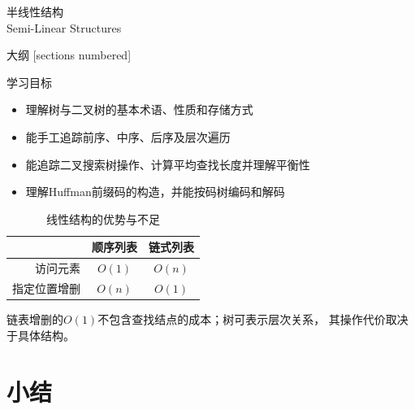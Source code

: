 \begin{standout}[第二章]
    半线性结构\\
    Semi-Linear Structures
\end{standout}

\begin{frame}{大纲}
    [sections numbered]
    \tableofcontents
\end{frame}

\begin{frame}{学习目标}
    \begin{itemize}
        \item 理解树与二叉树的基本术语、性质和存储方式
        \item 能手工追踪前序、中序、后序及层次遍历
        \item 能追踪二叉搜索树操作、计算平均查找长度并理解平衡性
        \item 理解Huffman前缀码的构造，并能按码树编码和解码
    \end{itemize}
\end{frame}

\begin{frame}
    \begin{table}
        \small
        \label{tab:linear_structures_disadvantages}
        \caption{线性结构的优势与不足}
        \begin{tabular}{rcc}
            \toprule
            & \textbf{顺序列表} & \textbf{链式列表} \\
            \midrule
            访问元素 & $O(1)$ & $O(n)$ \\
            指定位置增删 & $O(n)$ & $O(1)$ \\
            \bottomrule
        \end{tabular}
    \end{table}
    \pause
    \centering
    链表增删的$O(1)$不包含查找结点的成本；树可表示层次关系，
    其操作代价取决于具体结构。
\end{frame}






\section{小结}

